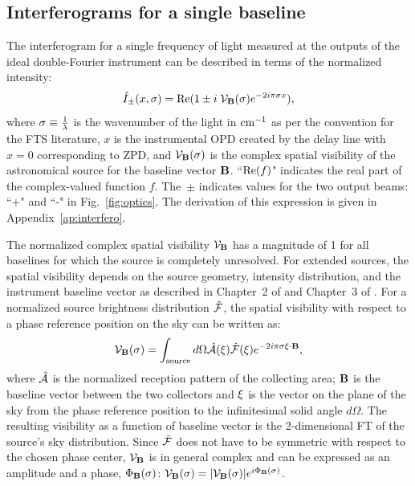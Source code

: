 \subsection{Interferograms for a single baseline}

The interferogram for a single frequency of light measured at the outputs of the ideal double-Fourier instrument can be 
described in terms of the normalized intensity:
\begin{equation}
\hat{I}_\pm(x,\sigma) = \textrm{Re}(1 \pm i \; \mathcal{V}_{\mathbf{B}}(\sigma) e^{-2i\pi \sigma x}),
\label{eq:basicinterferogram}
\end{equation}
where $\sigma \equiv {1 \over \lambda}$ is the wavenumber of the light in $\cm1$ as per the convention for the FTS literature, $x$ is the instrumental OPD created by the delay line with $x=0$ corresponding to ZPD, and $\mathcal{V}_{\mathbf{B}}(\sigma)$ is the complex spatial visibility
 of the astronomical source for the baseline vector $\mathbf{B}$. ``$\textrm{Re}(f)$" indicates the real part of the complex-valued function $f$. The~$\pm$ indicates values for the two output beams: ``+" and ``-" in Fig.~\ref{fig:optics}.
The derivation of this expression is given in Appendix~\ref{ap:interfero}.

The normalized complex spatial visibility $\mathcal{V}_{\mathbf{B}}$ has a magnitude of 1 for all baselines for which the source is completely unresolved. For extended sources, the spatial visibility depends on the source geometry, intensity distribution, and the instrument baseline vector as described in Chapter~2 of \citep{Lawson:2000vf} 
and Chapter~3 of \cite{Thompson:2008ww}.  
For a normalized source brightness distribution $\hat{\mathcal{F}}$, the spatial visibility with respect to a phase reference position on the sky can be written as:
\begin{equation}
\mathcal{V}_{\mathbf{B}}(\sigma)  =  \int_\textrm{source} d\Omega \hat{\mathcal{A}}(\xi) \hat{\mathcal{F}}(\xi ) e^{-2i\pi\sigma\xi\cdot \mathbf{B}},
\label{eq:viseq}
\end{equation}
where $\hat{\mathcal{A}}$ is the normalized reception pattern of the collecting area; $\mathbf{B}$ is the baseline vector between the two collectors and $\xi$ is the vector on the plane of the sky from the phase reference position to the infinitesimal solid angle $d\Omega$. The resulting visibility as a function of baseline vector is the 2-dimensional FT of the source's sky distribution. 
Since $\hat{\mathcal{F}}$ does not have to be symmetric with respect to the chosen phase center, $\mathcal{V}_{\mathbf{B}}$ is in general complex and can be expressed as an amplitude and a phase, $\Phi_\mathbf{B}(\sigma)$: $\mathcal{V}_{\mathbf{B}}(\sigma)  =  |\mathcal{V}_{\mathbf{B}}(\sigma)|e^{i\Phi_\mathbf{B}(\sigma)} $.


